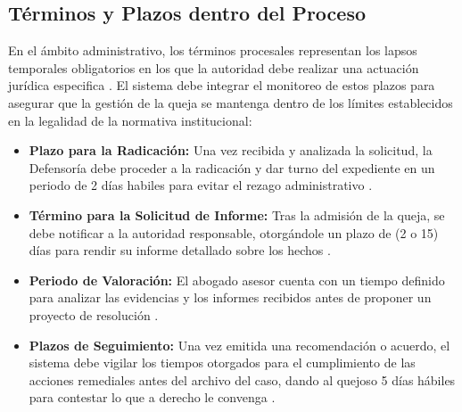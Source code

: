 \subsection{Términos y Plazos dentro del Proceso}
En el ámbito administrativo, los términos procesales representan los lapsos temporales obligatorios en los que la autoridad debe realizar una actuación jurídica especifica \cite{5} . El sistema debe integrar el monitoreo de estos plazos para asegurar que la gestión de la queja se mantenga dentro de los límites establecidos en la legalidad de la normativa institucional:
\begin{itemize}
    \item \textbf{Plazo para la Radicación:} Una vez recibida y analizada la solicitud, la Defensoría debe proceder a la radicación y dar turno del expediente en un periodo de 2 días habiles para evitar el rezago administrativo \cite{5} .
    \item \textbf{Término para la Solicitud de Informe:} Tras la admisión de la queja, se debe notificar a la autoridad responsable, otorgándole un plazo de (2 o 15) días para rendir su informe detallado sobre los hechos \cite{5} .
    \item \textbf{Periodo de Valoración:}  El abogado asesor cuenta con un tiempo definido para analizar las evidencias y los informes recibidos antes de proponer un proyecto de resolución \cite{5} .
    \item \textbf{Plazos de Seguimiento:} Una vez emitida una recomendación o acuerdo, el sistema debe vigilar los tiempos otorgados para el cumplimiento de las acciones remediales antes del archivo del caso, dando al quejoso 5 días hábiles para contestar lo que a derecho le convenga \cite{5} .
\end{itemize}

